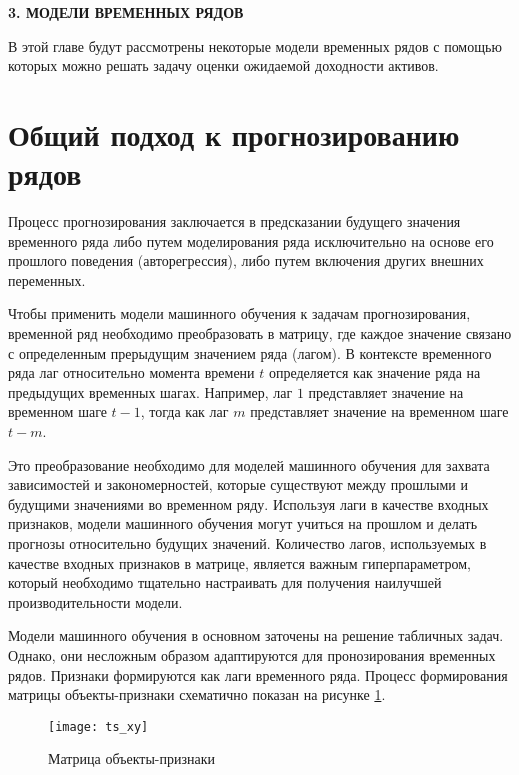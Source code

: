 \newpage
\begin{center}
	\textbf{\large 3. МОДЕЛИ ВРЕМЕННЫХ РЯДОВ}
\end{center}

В этой главе будут рассмотрены некоторые модели временных рядов
с помощью которых можно решать задачу оценки ожидаемой доходности активов.

\section{Общий подход к прогнозированию рядов}

Процесс прогнозирования заключается в предсказании будущего значения временного ряда либо путем 
моделирования ряда исключительно на основе его прошлого поведения (авторегрессия), либо путем включения других внешних переменных.

Чтобы применить модели машинного обучения к задачам прогнозирования, временной ряд необходимо преобразовать в матрицу, 
где каждое значение связано с определенным прерыдущим значением ряда (лагом). 
В контексте временного ряда лаг относительно момента времени $t$ определяется как значение ряда на предыдущих временных шагах. 
Например, лаг $1$ представляет значение на временном шаге $t-1$, тогда как лаг $m$ представляет значение на временном шаге $t-m$. 

Это преобразование необходимо для моделей машинного обучения для захвата зависимостей и закономерностей, которые существуют 
между прошлыми и будущими значениями во временном ряду. Используя лаги в качестве входных признаков, модели машинного 
обучения могут учиться на прошлом и делать прогнозы относительно будущих значений. Количество лагов, используемых в качестве 
входных признаков в матрице, является важным гиперпараметром, который необходимо тщательно настраивать для получения наилучшей 
производительности модели.

Модели машинного обучения в основном заточены на решение табличных задач. Однако, они несложным образом адаптируются 
для пронозирования временных рядов.
Признаки формируются как лаги временного ряда. Процесс формирования матрицы объекты-признаки схематично
показан на рисунке \ref{fig:feature_matrix}.

\begin{figure}[H]
	\texttt{[image: ts\_xy]}
	\caption{Матрица объекты-признаки}
	\label{fig:feature_matrix}
\end{figure}

